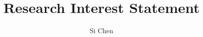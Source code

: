 \documentclass[11pt]{article}
\begin{document}
\title{Research Interest Statement}
\author{Si Chen}
\date{}
\maketitle

\end{document}
